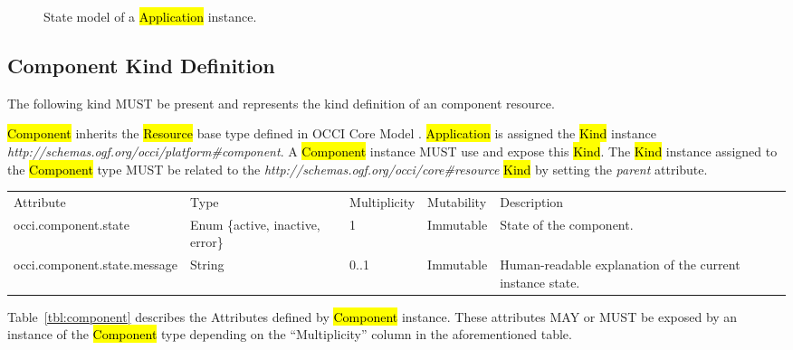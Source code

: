 \documentclass[10pt,a4paper]{article}
\begin{document}
\begin{figure}[!h]
	{\centering {} \par}
	\caption{State model of a \hl{Application} instance.}
	\label{fig:app_state}
\end{figure}

\subsection{Component Kind Definition}
The following kind MUST be present and represents the kind definition of an component resource.

\hl{Component} inherits the \hl{Resource} base type defined in OCCI Core Model \cite{occi:core}. \hl{Application} is assigned the \hl{Kind} instance \textit{http://schemas.ogf.org/occi/platform\#component}. A \hl{Component} instance MUST use and expose this \hl{Kind}. The \hl{Kind} instance assigned to the \hl{Component} type MUST be related to the \textit{http://schemas.ogf.org/occi/core\#resource} \hl{Kind} by setting the \textit{parent} attribute.

{
	\begin{tabular}{lp{2.5cm}p{1cm}lp{5cm}}
	\toprule
	Attribute&Type&Multi\-plicity&Mutability&Description\\
	\colrule
	occi.component.state & Enum \{active, inactive, error\} & 1 & Immutable & State of the component.\\
	occi.component.state.message & String & 0..1 & Immutable & Human-readable explanation of the current instance state.
	\botrule
	\end{tabular}
}

Table~\ref{tbl:component} describes the Attributes defined by \hl{Component} instance. These attributes MAY or MUST be exposed by an instance of the \hl{Component} type depending on the ``Multiplicity'' column in the aforementioned table.
\end{document}
